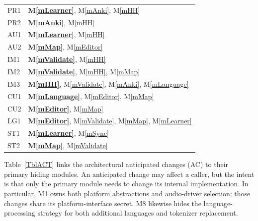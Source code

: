 \documentclass[12pt, titlepage]{article}
\newcommand{\mref}[1]{M\ref{#1}}
\begin{document}
\begin{longtable}{@{}p{}p{}@{}}
PR1 & \textbf{\mref{mLearner}}, \mref{mAnki}, \mref{mHH}\\
PR2 & \textbf{\mref{mAnki}}, \mref{mHH}\\
AU1 & \textbf{\mref{mLearner}}, \mref{mHH}\\
AU2 & \textbf{\mref{mMap}}, \mref{mEditor}\\
IM1 & \textbf{\mref{mValidate}}, \mref{mHH}\\
IM2 & \textbf{\mref{mValidate}}, \mref{mHH}, \mref{mMap}\\
IM3 & \textbf{\mref{mHH}}, \mref{mValidate}, \mref{mAnki}, \mref{mLanguage}\\
CU1 & \textbf{\mref{mLanguage}}, \mref{mEditor}, \mref{mMap}\\
CU2 & \textbf{\mref{mEditor}}, \mref{mMap}\\
LG1 & \textbf{\mref{mEditor}}, \mref{mValidate}, \mref{mMap}, \mref{mLearner}\\
ST1 & \textbf{\mref{mLearner}}, \mref{mSync}\\
ST2 & \textbf{\mref{mMap}}, \mref{mValidate}\\

\end{longtable}
\normalsize

Table~\ref{TblACT} links the architectural anticipated changes (AC)
to their primary hiding modules. An anticipated change may affect a
caller, but the intent is that only the primary module needs to change
its internal implementation. In particular, M1 owns both platform
abstractions and audio-driver selection; those changes share its
platform-interface secret. M8 likewise hides the language-processing
strategy for both additional languages and tokenizer replacement.
\end{document}
